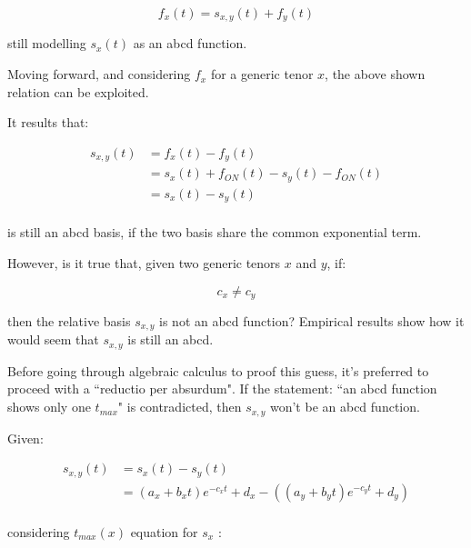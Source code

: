 {\begin{equation}
     f_{x}(t)=s_{x,y}(t)+f_{y}(t)
     \label{eq:forward as basis + y}
\end{equation}

still modelling $s_{x}(t)$ as an abcd function.

Moving forward, and considering $f_{x}$ for a generic tenor $x$, the above shown relation can be exploited.

It results that:

\begin{equation}
\begin{split}
s_{x,y}(t)& =f_{x}(t)-f_{y}(t)\\
& =s_{x}(t)+f_{ON}(t)-s_{y}(t)-f_{ON}(t)\\
& =s_{x}(t)-s_{y}(t)\\
\end{split}
\label{eq:still_abcd}
\end{equation}

is still an abcd basis, if the two basis share the common exponential term.

However, is it true that, given two generic tenors $x$ and $y$, if: 

\begin{equation}
    c_{x} \neq c_{y}
\end{equation}

then the relative basis $s_{x,y}$ is not an abcd function?
Empirical results show how it would seem that $s_{x,y}$ is still an abcd.

Before going through algebraic calculus to proof this guess, it's preferred to proceed with a ``reductio per absurdum". If the statement: ``an abcd function shows only one $t_{max}$" is contradicted, then $s_{x,y}$ won't be an abcd function.

Given:

\begin{equation}
\begin{split}
s_{x,y}(t)& =s_{x}(t)-s_{y}(t)\\
& =(a_{x}+b_{x}t)e^{-c_{x}t}+d_{x}-((a_{y}+b_{y}t)e^{-c_{y}t}+d_{y})\\
\end{split}
\label{eq:abcd_diff_c}
\end{equation}

considering $t_{max}(x)$ equation for $s_{x}$ :

}
